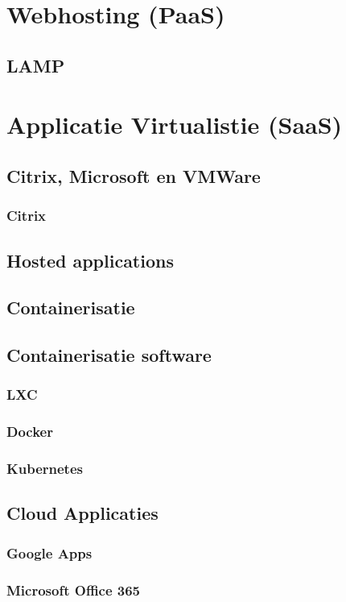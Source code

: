 \documentclass[a4paper,12pt,twoside,openright,titlepage]{book}
\begin{document}
\chapter{Webhosting (PaaS)}
\section{LAMP}

\chapter{Applicatie Virtualistie (SaaS)}

\section{Citrix, Microsoft en VMWare}
\subsection{Citrix}

\section{Hosted applications}
\section{Containerisatie}
\section{Containerisatie software}
\subsection{LXC}
\subsection{Docker}
\subsection{Kubernetes}
\section{Cloud Applicaties}
\subsection{Google Apps}
\subsection{Microsoft Office 365}

\printindex
\end{document}
